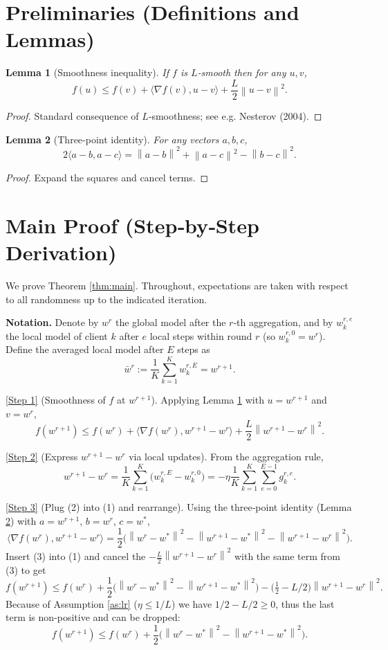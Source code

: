 \documentclass{article}
\newtheorem{lemma}{Lemma}
\newcommand{\norm}[1]{\left\lVert#1\right\rVert}
\newcommand{\inner}[2]{\langle #1,#2\rangle}
\newcommand{\grad}{\nabla}
\begin{document}
\newpage
\section*{Preliminaries (Definitions and Lemmas)}
\begin{lemma}[Smoothness inequality]\label{lem:smooth}
If $f$ is $L$‑smooth then for any $u,v$,
\[
f(u)\le f(v)+\inner{\grad f(v)}{u-v}+\frac{L}{2}\norm{u-v}^{2}.
\]
\end{lemma}
\begin{proof}
Standard consequence of $L$‑smoothness; see e.g. Nesterov (2004).
\end{proof}

\begin{lemma}[Three‑point identity]\label{lem:three}
For any vectors $a,b,c$,
\[
2\inner{a-b}{a-c}= \norm{a-b}^{2}+\norm{a-c}^{2}-\norm{b-c}^{2}.
\]
\end{lemma}
\begin{proof}
Expand the squares and cancel terms.
\end{proof}

\section*{Main Proof (Step‑by‑Step Derivation)}
We prove Theorem \ref{thm:main}.  Throughout, expectations are taken
with respect to all randomness up to the indicated iteration.

\noindent\textbf{Notation.}
Denote by $w^{r}$ the global model after the $r$‑th aggregation,
and by $w_{k}^{r,e}$ the local model of client $k$ after $e$ local steps
within round $r$ (so $w_{k}^{r,0}=w^{r}$).  Define the averaged local model
after $E$ steps as
\[
\bar w^{r}:=\frac1K\sum_{k=1}^{K} w_{k}^{r,E}=w^{r+1}.
\]

\noindent\underline{[Step 1]} (Smoothness of $f$ at $w^{r+1}$).  
Applying Lemma \ref{lem:smooth} with $u=w^{r+1}$ and $v=w^{r}$,
\[
f(w^{r+1})\le f(w^{r})+\inner{\grad f(w^{r})}{w^{r+1}-w^{r}}
+\frac{L}{2}\norm{w^{r+1}-w^{r}}^{2}. \tag{1}
\]

\noindent\underline{[Step 2]} (Express $w^{r+1}-w^{r}$ via local updates).  
From the aggregation rule,
\[
w^{r+1}-w^{r}= \frac1K\sum_{k=1}^{K}\big(w_{k}^{r,E}-w_{k}^{r,0}\big)
= -\eta\frac1K\sum_{k=1}^{K}\sum_{e=0}^{E-1} g_{k}^{r,e}. \tag{2}
\]

\noindent\underline{[Step 3]} (Plug (2) into (1) and rearrange).  
Using the three‑point identity (Lemma \ref{lem:three}) with
$a=w^{r+1}$, $b=w^{r}$, $c=w^{*}$,
\[
\inner{\grad f(w^{r})}{w^{r+1}-w^{r}}
= \frac12\Big(\norm{w^{r}-w^{*}}^{2}-\norm{w^{r+1}-w^{*}}^{2}
-\norm{w^{r+1}-w^{r}}^{2}\Big). \tag{3}
\]
Insert (3) into (1) and cancel the $-\frac{L}{2}\norm{w^{r+1}-w^{r}}^{2}$
with the same term from (3) to get
\[
f(w^{r+1})\le f(w^{r})
+\frac12\bigl(\norm{w^{r}-w^{*}}^{2}-\norm{w^{r+1}-w^{*}}^{2}\bigr)
-\bigl(\tfrac12-L/2\bigr)\norm{w^{r+1}-w^{r}}^{2}. \tag{4}
\]
Because of Assumption \ref{as:lr} ($\eta\le1/L$) we have $1/2-L/2\ge0$, thus the
last term is non‑positive and can be dropped:
\[
f(w^{r+1})\le f(w^{r})
+\frac12\bigl(\norm{w^{r}-w^{*}}^{2}-\norm{w^{r+1}-w^{*}}^{2}\bigr). \tag{5}
\]
\end{document}
